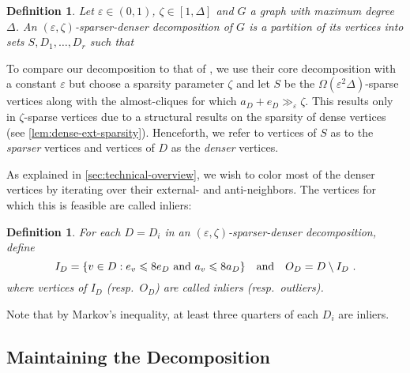 \documentclass[a4paper,english,11pt]{amsart}
\newtheorem{definition}[lemma]{Definition}
\theoremstyle{definition}
\renewcommand{\leq}{\leqslant}
\DeclarePairedDelimiter{\set}{\{}{\}}
\newcommand{\eps}{\varepsilon}
\begin{document}
\begin{definition}
    \label{def:refined-acd}
    Let $\eps \in(0,1)$, $\zeta \in [1,\Delta]$ and $G$ a graph with maximum degree $\Delta$. An $(\eps,\zeta)$-\emph{sparser-denser decomposition} of $G$ is a partition of its vertices into sets $S, D_1, \ldots, D_r$ such that
\end{definition}
To compare our decomposition to that of \cite{Reed98,HSS18,ACK19}, we use their core decomposition with a constant $\eps$ but choose a sparsity parameter $\zeta$ and let $S$ be the $\Omega(\eps^2\Delta)$-sparse vertices along with the almost-cliques for which $a_D + e_D \gg_\eps \zeta$. This results only in $\zeta$-sparse vertices due to a structural results on the sparsity of dense vertices (see \cref{lem:dense-ext-sparsity}).
Henceforth, we refer to vertices of $S$ as to the \emph{sparser} vertices and vertices of $D$ as the \emph{denser} vertices.

As explained in \cref{sec:technical-overview}, we wish to color most of the denser vertices by iterating over their external- and anti-neighbors. The vertices for which this is feasible are called inliers:
\begin{definition}
    \label{def:inliers}
    For each $D = D_i$ in an $(\eps,\zeta)$-sparser-denser decomposition, define
    \[
    I_D = \set{ v\in D : e_v \leq 8 e_D \text{ and } a_v \leq 8 a_D }
    \quad\text{and}\quad
    O_D = D \setminus I_D \ .
    \]
    where vertices of $I_D$ (resp.\ $O_D$) are called \emph{inliers} (resp.\ \emph{outliers}).
\end{definition}
Note that by Markov's inequality, at least three quarters of each $D_i$ are inliers.


\subsection{Maintaining the Decomposition}
\end{document}
